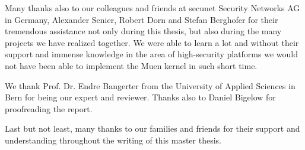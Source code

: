 \documentclass[a4paper,twoside]{report}
\begin{document}
Many thanks also to our colleagues and friends at secunet Security Networks AG
in Germany, Alexander Senier, Robert Dorn and Stefan Berghofer for their
tremendous assistance not only during this thesis, but also during the many
projects we have realized together. We were able to learn a lot and without
their support and immense knowledge in the area of high-security platforms we
would not have been able to implement the Muen kernel in such short time.

We thank Prof. Dr. Endre Bangerter from the University of Applied Sciences in
Bern for being our expert and reviewer. Thanks also to Daniel Bigelow for
proofreading the report.

Last but not least, many thanks to our families and friends for their support
and understanding throughout the writing of this master thesis.

\tableofcontents
\listoffigures
\listoftables
\lstlistoflistings








\printindex{}



\end{document}
